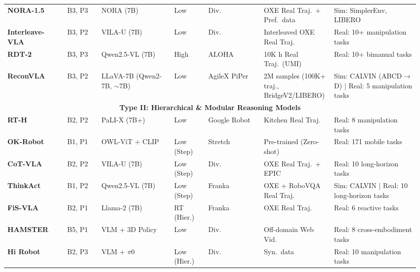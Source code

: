 \documentclass[acmsmall,screen,review,anonymous]{acmart}
\begin{document}
\begin{table}[t!]
\begin{tabular}{
  p{0.14\linewidth}
  p{0.08\linewidth}
  p{0.17\linewidth}
  p{0.08\linewidth}
  p{0.13\linewidth}
  p{0.168\linewidth}
  p{0.205\linewidth}
}
\textbf{NORA-1.5}~\cite{hung2025nora15} & B3, P3 & NORA (7B) & Low & Div. & OXE Real Traj.\ + Pref.\ data & Sim: SimplerEnv, LIBERO \\

\textbf{Interleave-VLA}~\cite{fan2026interleave} & B3, P2 & VILA-U (7B) & Low & Div. & Interleaved OXE Real Traj. & Real: 10+ manipulation tasks \\

\textbf{RDT-2}~\cite{liu2026rdt2} & B3, P3 & Qwen2.5-VL (7B) & High & ALOHA & 10K h Real Traj.\ (UMI) & Real: 10+ bimanual tasks \\

\textbf{ReconVLA}~\cite{song2025reconvla} & B3, P2 & LLaVA-7B (Qwen2-7B, $\sim$7B) & Low & AgileX PiPer & 2M samples (100K+ traj., BridgeV2/LIBERO) & Sim: CALVIN (ABCD$\rightarrow$D) | Real: 5 manipulation tasks \\

\midrule

\multicolumn{7}{c}{\textbf{Type II\@: Hierarchical \& Modular Reasoning Models}} \\
\midrule

\textbf{RT-H}~\cite{belkhale2024rth} & B2, P2 & PaLI-X (7B+) & Low & Google Robot & Kitchen Real Traj. & Real: 8 manipulation tasks \\

\textbf{OK-Robot}~\cite{liu2024okrobot} & B1, P1 & OWL-ViT + CLIP & Low (Step) & Stretch & Pre-trained (Zero-shot) & Real: 171 mobile tasks \\

\textbf{CoT-VLA}~\cite{zhao2025cotvla} & B2, P2 & VILA-U (7B) & Low (Step) & Div. & OXE Real Traj.\ + EPIC & Real: 10 long-horizon tasks \\

\textbf{ThinkAct}~\cite{huang2025thinkact} & B1, P2 & Qwen2.5-VL (7B) & Low (Step) & Franka & OXE + RoboVQA Real Traj. & Sim: CALVIN | Real: 10 long-horizon tasks \\

\textbf{FiS-VLA}~\cite{chen2025fis} & B2, P1 & Llama-2 (7B) & RT (Hier.) & Franka & OXE Real Traj. & Real: 6 reactive tasks \\

\textbf{HAMSTER}~\cite{li2025hamster} & B5, P1 & VLM + 3D Policy & Low & Div. & Off-domain Web Vid. & Real: 8 cross-embodiment tasks \\

\textbf{Hi Robot}~\cite{shi2025hirobot} & B2, P3 & VLM + $\pi$0 & Low (Hier.) & Div. & Syn.\ data & Real: 10 manipulation tasks \\


\end{tabular}
\end{table}
\end{document}
